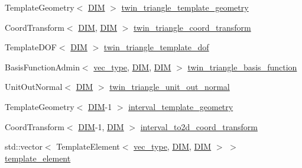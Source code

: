\begin{DoxyCompactItemize}
\item 
Template\+Geometry$<$ \mbox{\hyperlink{complex__node___t_h_f_e_m_2uiexp_8h_a589b8b9bfdf714f736059845d568b597}{D\+IM}} $>$ \mbox{\hyperlink{classui_experiment_a880d54a1384f86b7bacc8dfb476a20e6}{twin\+\_\+triangle\+\_\+template\+\_\+geometry}}
\item 
Coord\+Transform$<$ \mbox{\hyperlink{complex__node___t_h_f_e_m_2uiexp_8h_a589b8b9bfdf714f736059845d568b597}{D\+IM}}, \mbox{\hyperlink{complex__node___t_h_f_e_m_2uiexp_8h_a589b8b9bfdf714f736059845d568b597}{D\+IM}} $>$ \mbox{\hyperlink{classui_experiment_a6607a6e91fd6cd91332f6cda9964193f}{twin\+\_\+triangle\+\_\+coord\+\_\+transform}}
\item 
Template\+D\+OF$<$ \mbox{\hyperlink{complex__node___t_h_f_e_m_2uiexp_8h_a589b8b9bfdf714f736059845d568b597}{D\+IM}} $>$ \mbox{\hyperlink{classui_experiment_a4f54e2b65f1b693be17259d4ec19e93b}{twin\+\_\+triangle\+\_\+template\+\_\+dof}}
\item 
Basis\+Function\+Admin$<$ \mbox{\hyperlink{complex__edge___t_h_f_e_m_2emdefs_8h_a0a0de407de54661e0d56aa8686c104d9}{vec\+\_\+type}}, \mbox{\hyperlink{complex__node___t_h_f_e_m_2uiexp_8h_a589b8b9bfdf714f736059845d568b597}{D\+IM}}, \mbox{\hyperlink{complex__node___t_h_f_e_m_2uiexp_8h_a589b8b9bfdf714f736059845d568b597}{D\+IM}} $>$ \mbox{\hyperlink{classui_experiment_ab2decc2422c7eac7248bb615f629b312}{twin\+\_\+triangle\+\_\+basis\+\_\+function}}
\item 
Unit\+Out\+Normal$<$ \mbox{\hyperlink{complex__node___t_h_f_e_m_2uiexp_8h_a589b8b9bfdf714f736059845d568b597}{D\+IM}} $>$ \mbox{\hyperlink{classui_experiment_a3240a812867c50cd296cff62e86731d5}{twin\+\_\+triangle\+\_\+unit\+\_\+out\+\_\+normal}}
\item 
Template\+Geometry$<$ \mbox{\hyperlink{complex__node___t_h_f_e_m_2uiexp_8h_a589b8b9bfdf714f736059845d568b597}{D\+IM}}-\/1 $>$ \mbox{\hyperlink{classui_experiment_a604866b155caa1e05fa9e23f37822885}{interval\+\_\+template\+\_\+geometry}}
\item 
Coord\+Transform$<$ \mbox{\hyperlink{complex__node___t_h_f_e_m_2uiexp_8h_a589b8b9bfdf714f736059845d568b597}{D\+IM}}-\/1, \mbox{\hyperlink{complex__node___t_h_f_e_m_2uiexp_8h_a589b8b9bfdf714f736059845d568b597}{D\+IM}} $>$ \mbox{\hyperlink{classui_experiment_a58e8bc2ca812d734691af34491626d5b}{interval\+\_\+to2d\+\_\+coord\+\_\+transform}}
\item 
std\+::vector$<$ Template\+Element$<$ \mbox{\hyperlink{complex__edge___t_h_f_e_m_2emdefs_8h_a0a0de407de54661e0d56aa8686c104d9}{vec\+\_\+type}}, \mbox{\hyperlink{complex__node___t_h_f_e_m_2uiexp_8h_a589b8b9bfdf714f736059845d568b597}{D\+IM}}, \mbox{\hyperlink{complex__node___t_h_f_e_m_2uiexp_8h_a589b8b9bfdf714f736059845d568b597}{D\+IM}} $>$ $>$ \mbox{\hyperlink{classui_experiment_a9716ddbac22d7311f919fe55991e8930}{template\+\_\+element}}

\end{DoxyCompactItemize}
